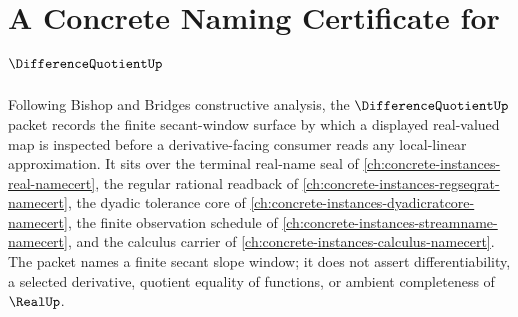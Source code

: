 \chapter{A Concrete Naming Certificate for $\DifferenceQuotientUp$}
\label{ch:concrete-instances-difference-quotient-namecert}

Following Bishop and Bridges constructive analysis, the $\DifferenceQuotientUp$ packet records the finite secant-window surface by which a displayed real-valued map is inspected before a derivative-facing consumer reads any local-linear approximation. It sits over the terminal real-name seal of \autoref{ch:concrete-instances-real-namecert}, the regular rational readback of \autoref{ch:concrete-instances-regseqrat-namecert}, the dyadic tolerance core of \autoref{ch:concrete-instances-dyadicratcore-namecert}, the finite observation schedule of \autoref{ch:concrete-instances-streamname-namecert}, and the calculus carrier of \autoref{ch:concrete-instances-calculus-namecert}. The packet names a finite secant slope window; it does not assert differentiability, a selected derivative, quotient equality of functions, or ambient completeness of $\RealUp$.



